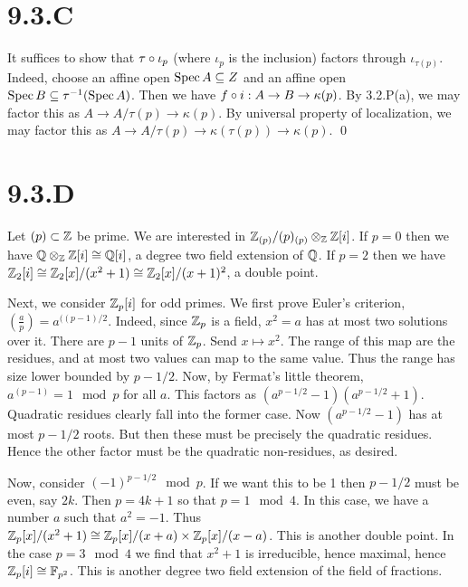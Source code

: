 \documentclass{article}
\begin{document}
\section{9.3.C}
It suffices to show that $\tau \circ \iota_p$ (where $\iota_p$
is the inclusion) factors through $\iota_{\tau(p)}$. Indeed, choose an
affine open $\operatorname{Spec} A \subseteq Z$ and an affine open $\operatorname{Spec} B \subseteq \tau^{-1}(\operatorname{Spec} A)$.
Then we have $f \circ i: A \to B \to \kappa(p)$. By 3.2.P(a), we may factor this as
$A \to A/\tau(p) \to \kappa(p)$. By universal property of localization, we may factor
this as $A \to A/\tau(p) \to \kappa(\tau(p)) \to
    \kappa(p)$. \qed

\section{9.3.D}
Let $(p) \subset \mathbb{Z}$ be prime. We are interested in
$\mathbb{Z}_{(p)}/(p)_{(p)}
    \otimes_{\mathbb{Z}} \mathbb{Z}[i]$. If $p=0$ then we have
$\mathbb{Q} \otimes_{\mathbb{Z}} \mathbb{Z}[i] \cong
    \mathbb{Q}[i]$, a degree two field extension of $\mathbb{Q}$.
If $p=2$ then we have $\mathbb{Z}_2[i] \cong \mathbb{Z}_2[x]/(x^2+1) \cong
    \mathbb{Z}_2[x]/(x+1)^2$, a double point.

Next, we consider $\mathbb{Z}_p[i]$ for odd primes. We first prove Euler's
criterion, $(\frac{a}{p})=a^{((p-1)/2}$. Indeed, since $\mathbb{Z}_p$ is a
field, $x^2=a$ has at most two solutions over it. There are
$p-1$ units of $\mathbb{Z}_p$. Send
$x \mapsto x^2$. The range of this map are the residues, and at most two
values can map to the same value. Thus the range has size lower bounded by
$p-1/2$. Now, by Fermat's little theorem, $a^(p-1)=1 \mod p$
for all $a$. This factors as $(a^{p-1/2}-1)(a^{p-1/2}+1)$.
Quadratic residues clearly fall into the former case. Now
$(a^{p-1/2}-1)$ has at most $p-1/2$ roots. But then these
must be precisely the quadratic residues. Hence the other factor must be the
quadratic non-residues, as desired.

Now, consider $(-1)^{p-1/2} \mod p$. If we want this to be 1 then
$p-1/2$ must be even, say $2k$. Then
$p=4k+1$ so that $p = 1 \mod 4$. In this case, we have a
number $a$ such that $a^2=-1$. Thus
$\mathbb{Z}_p[x]/(x^2+1) \cong \mathbb{Z}_p[x]/(x+a) \times
    \mathbb{Z}_p[x]/(x-a)$. This is another double point. In the case
$p=3 \mod 4$ we find that $x^2+1$ is irreducible,
hence maximal, hence $\mathbb{Z}_p[i] \cong \mathbb{F}_{p^2}$. This is another degree two field
extension of the field of fractions.
\end{document}
